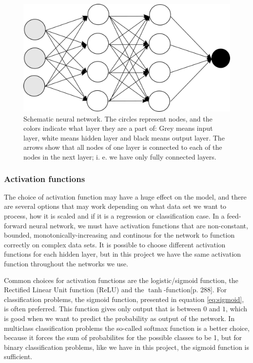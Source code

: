\begin{figure}
\hypertarget{fig:nn}{%
\centering
\includegraphics[scale=0.6]{Figures/Theory/neural-network.png}
\caption{Schematic neural network. The circles represent nodes, and
the colors indicate what layer they are a part of: Grey means input
layer, white means hidden layer and black means output layer. The arrows
show that all nodes of one layer is connected to each of the nodes
in the next layer; i. e. we have only fully connected
layers.}\label{fig:nn}
}
\end{figure}

\subsubsection{Activation functions}\label{activation-functions}

The choice of activation function may have a huge effect on the model,
and there are several options that may work depending on what data set
we want to process, how it is scaled and if it is a regression or
classification case. In a feed-forward neural network, we must have
activation functions that are non-constant, bounded,
monotonically-increasing and continous for the network to function
correctly on complex data sets. It is possible to choose different
activation functions for each hidden layer, but in this project we have
the same activation function throughout the networks we use.

Common choices for activation functions are the logistic/sigmoid
function, the Rectified Linear Unit function (ReLU) and the
\(\tanh\)-function\cite{geron}[p. 288]. For classification problems, the sigmoid function,
presented in equation \ref{eq:sigmoid}, is often preferred. This function
gives only output that is between \(0\) and \(1\), which is good when we
want to predict the probability as output of the network. In multiclass
classification problems the so-called softmax function is a better
choice, because it forces the sum of probabilites for the possible
classes to be 1, but for binary classification problems, like we have in
this project, the sigmoid function is sufficient.

